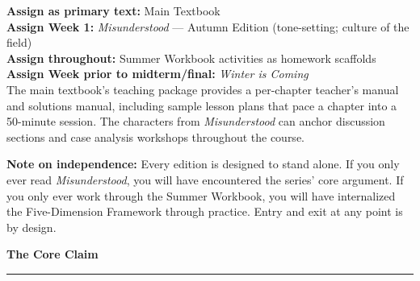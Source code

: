 \documentclass[12pt, a4paper]{article}
\newcommand{\amberrule}{%
  {\color{rulecolor}\rule{\linewidth}{0.5pt}}%
}
\begin{document}
\vspace{10pt}

\begin{tcolorbox}[
  enhanced,
  colback=white,
  colframe=textbookteal,
  arc=4pt,
  boxrule=1pt,
  left=12pt, right=12pt, top=10pt, bottom=10pt,
  attach boxed title to top left={yshift=-2mm, xshift=6mm},
  boxed title style={colback=textbookteal, colframe=textbookteal, arc=3pt, boxrule=0pt,
    fontupper=\small\bfseries\sffamily\color{white}, left=6pt, right=6pt, top=3pt, bottom=3pt},
  title={Course Instructor Path}
]
\textbf{Assign as primary text:} Main Textbook\\
\textbf{Assign Week 1:} \textit{Misunderstood} — Autumn Edition (tone-setting; culture of the field)\\
\textbf{Assign throughout:} Summer Workbook activities as homework scaffolds\\
\textbf{Assign Week prior to midterm/final:} \textit{Winter is Coming}\\[6pt]
The main textbook's teaching package provides a per-chapter teacher's manual and solutions manual, including sample lesson plans that pace a chapter into a 50-minute session. The characters from \textit{Misunderstood} can anchor discussion sections and case analysis workshops throughout the course.
\end{tcolorbox}

\vspace{10pt}

\begin{tcolorbox}[amberstyle]
\textbf{Note on independence:} Every edition is designed to stand alone. If you only ever read \textit{Misunderstood}, you will have encountered the series' core argument. If you only ever work through the Summer Workbook, you will have internalized the Five-Dimension Framework through practice. Entry and exit at any point is by design.
\end{tcolorbox}

\newpage

\thispagestyle{fancy}

\vspace*{1.5cm}

\begin{center}
{\footnotesize\sffamily\color{midgrey}}

\vspace{0.8cm}

{\Large\bfseries\color{charcoal} The Core Claim}

\vspace{0.5cm}
\amberrule
\end{center}
\end{document}
